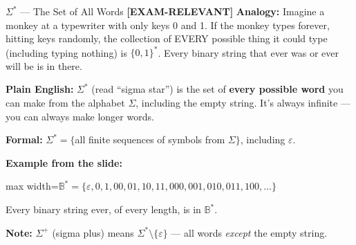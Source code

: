 \documentclass[11pt,a4paper]{article}
\newcommand{\fitmath}[1]{\begin{adjustbox}{max width=\linewidth}$\displaystyle #1$\end{adjustbox}}
\newcommand{\kemark}{\textcolor{red!70!black}{\textbf{[EXAM-RELEVANT]}}}
\begin{document}
\begin{definitionbox}{$\Sigma^*$ --- The Set of All Words \kemark}
\textbf{Analogy:} Imagine a monkey at a typewriter with only keys 0 and 1. If the monkey types forever, hitting keys randomly, the collection of EVERY possible thing it could type (including typing nothing) is $\{0,1\}^*$. Every binary string that ever was or ever will be is in there.

\textbf{Plain English:} $\Sigma^*$ (read ``sigma star'') is the set of \textbf{every possible word} you can make from the alphabet $\Sigma$, including the empty string. It's always infinite --- you can always make longer words.

\textbf{Formal:} $\Sigma^* = \{$all finite sequences of symbols from $\Sigma\}$, including $\varepsilon$.

\textbf{Example from the slide:}
\fitmath{\mathbb{B}^* = \{\varepsilon, 0, 1, 00, 01, 10, 11, 000, 001, 010, 011, 100, \ldots\}}

Every binary string ever, of every length, is in $\mathbb{B}^*$.

\textbf{Note:} $\Sigma^+$ (sigma plus) means $\Sigma^* \setminus \{\varepsilon\}$ --- all words \textit{except} the empty string.
\end{definitionbox}
\end{document}
